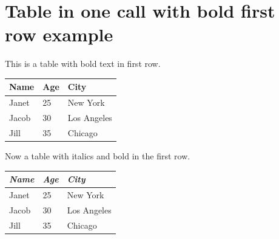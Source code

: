 \documentclass[a4paper]{report}
\begin{document}
\chapter{Table in one call with bold first row example}

This is a table with bold text in first row.

\noindent
\begin{tabular}{lll}
\toprule
\textbf{Name} & \textbf{Age} & \textbf{City} \\
\midrule
Janet & 25 & New York \\
Jacob & 30 & Los Angeles \\
Jill & 35 & Chicago \\
\bottomrule
\end{tabular}
\par\medskip

Now a table with italics and bold in the first row.

\noindent
\begin{tabular}{lll}
\toprule
\textit{\textbf{Name}} & \textit{\textbf{Age}} & \textit{\textbf{City}} \\
\midrule
Janet & 25 & New York \\
Jacob & 30 & Los Angeles \\
Jill & 35 & Chicago \\
\bottomrule
\end{tabular}
\par\medskip
\end{document}
